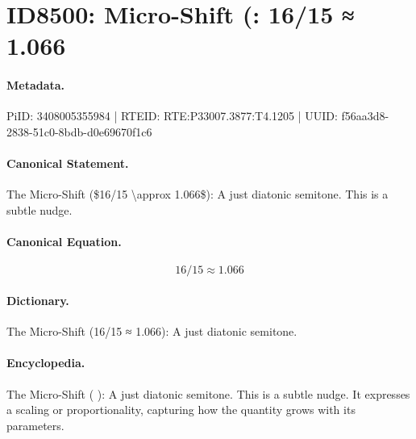 \section*{ID8500: Micro-Shift (: 16/15 ≈ 1.066}
\paragraph{Metadata.}
PiID: 3408005355984 | RTEID: RTE:P33007.3877:T4.1205 | UUID: f56aa3d8-2838-51c0-8bdb-d0e69670f1c6

\paragraph{Canonical Statement.}
The Micro-Shift (\$16/15 \textbackslash{}approx 1.066\$): A just diatonic semitone. This is a subtle nudge.

\paragraph{Canonical Equation.}
\[
16/15 \approx 1.066
\]

\paragraph{Dictionary.}
The Micro-Shift (16/15 ≈ 1.066): A just diatonic semitone.

\paragraph{Encyclopedia.}
The Micro-Shift ( ): A just diatonic semitone. This is a subtle nudge. It expresses a scaling or proportionality, capturing how the quantity grows with its parameters.

